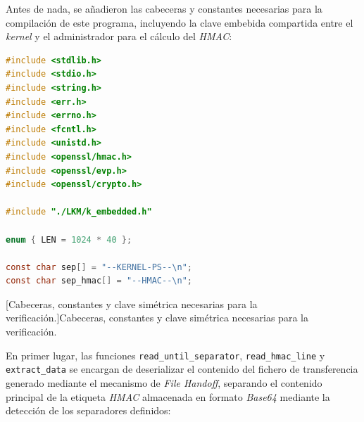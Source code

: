 Antes de nada, se añadieron las cabeceras y constantes necesarias para la compilación de este programa, incluyendo la clave embebida compartida entre el \textit{kernel} y el administrador para el cálculo del \textit{HMAC}:

\begin{lstlisting}[language=C]
#include <stdlib.h>
#include <stdio.h>
#include <string.h>
#include <err.h>
#include <errno.h>
#include <fcntl.h>
#include <unistd.h>
#include <openssl/hmac.h>
#include <openssl/evp.h>
#include <openssl/crypto.h>

#include "./LKM/k_embedded.h"

enum { LEN = 1024 * 40 };

const char sep[] = "--KERNEL-PS--\n";
const char sep_hmac[] = "--HMAC--\n";
\end{lstlisting}
\captionsetup{type=code,justification=centering,singlelinecheck=false}
[Cabeceras, constantes y clave simétrica necesarias para la verificación.]{Cabeceras, constantes y clave simétrica necesarias para la verificación.}
\label{cod:check_hmac}
\vspace{\baselineskip}

En primer lugar, las funciones \verb|read_until_separator|, \verb|read_hmac_line| y \verb|extract_data| se encargan de deserializar el contenido del fichero de transferencia generado mediante el mecanismo de \textit{File Handoff}, separando el contenido principal de la etiqueta \textit{HMAC} almacenada en formato \textit{Base64} mediante la detección de los separadores definidos:\\

